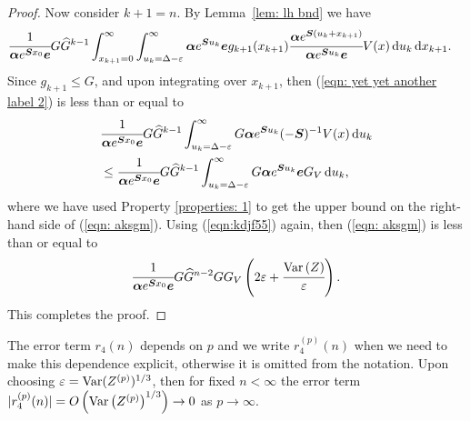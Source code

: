 \begin{proof}
	Now consider \(k+1=n\). By Lemma~\ref{lem: lh bnd} we have 
	\begin{align}
		&\cfrac{1}{\boldsymbol \alpha e^{\boldsymbol{S} x_0 }\boldsymbol e}G \widehat G^{k-1}
		\int_{x_{k+1}=0}^\infty \int_{u_k=\Delta-\varepsilon}^\infty \boldsymbol \alpha e^{\boldsymbol{S}u_k}\boldsymbol e g_{k+1}(x_{k+1}) \cfrac{\boldsymbol\alpha e^{\boldsymbol{S}(u_k+x_{k+1})}}{\boldsymbol \alpha e^{\boldsymbol{S}u_k}\boldsymbol e}V(x)\, \mathrm{d} u_k \, \mathrm{d} x_{k+1}. \label{eqn: yet yet another label 2}
		\end{align}
		{Since \(g_{k+1}\leq G\), and upon integrating over \(x_{k+1}\), then (\ref{eqn: yet yet another label 2}) is less than or equal to }
		\begin{align}
		& \cfrac{1}{\boldsymbol \alpha e^{\boldsymbol{S} x_0 }\boldsymbol e}G \widehat G^{k-1}  
		\int_{u_k=\Delta-\varepsilon}^\infty G \boldsymbol\alpha e^{\boldsymbol{S}u_k}(-\boldsymbol S)^{-1}V(x) \, \mathrm{d} u_k\nonumber 
		\\&\leq \cfrac{1}{\boldsymbol \alpha e^{\boldsymbol{S} x_0 }\boldsymbol e}G \widehat G^{k-1}  
		\int_{u_k=\Delta-\varepsilon}^\infty G \boldsymbol \alpha e^{\boldsymbol S u_k} \boldsymbol e G_V \, \mathrm{d} u_k , \label{eqn: aksgm}
	\end{align}
	where we have used Property \ref{properties: 1} to get the upper bound on the right-hand side of (\ref{eqn: aksgm}). Using (\ref{eqn:kdjf55}) again, then (\ref{eqn: aksgm}) is less than or equal to
	\begin{align}
		\cfrac{1}{\boldsymbol \alpha e^{\boldsymbol{S} x_0 }\boldsymbol e}G\widehat G^{n-2}   G G_V\left(2\varepsilon + \cfrac{\mathrm{Var}\left(Z\right)}{\varepsilon}\right).
	\end{align}
	This completes the proof.  
\end{proof}

The error term \(r_4(n)\) depends on \(p\) and we write \(r_4^{(p)}(n)\) when we need to make this dependence explicit, otherwise it is omitted from the notation. Upon choosing \(\varepsilon = \mathrm{Var}(Z^{(p)})^{1/3}\), then for fixed \(n<\infty\) the error term \(|r_4^{(p)}(n)|= O\left(\mathrm{Var}\left(Z^{(p)}\right)^{1/3}\right)\to 0\) as \(p\to\infty\). 

